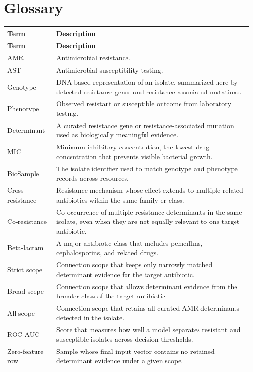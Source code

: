 \chapter*{Glossary}
{}

\begingroup
\small
\renewcommand{\arraystretch}{1.02}
\setlength{\LTpre}{0pt}
\setlength{\LTpost}{0pt}
\begin{longtable}{|p{}|p{}|}
\hline
\textbf{Term} & \textbf{Description} \\ \hline
\endfirsthead
\hline
\textbf{Term} & \textbf{Description} \\ \hline
\endhead
AMR & Antimicrobial resistance. \\ \hline
AST & Antimicrobial susceptibility testing. \\ \hline
Genotype & DNA-based representation of an isolate, summarized here by detected resistance genes and resistance-associated mutations. \\ \hline
Phenotype & Observed resistant or susceptible outcome from laboratory testing. \\ \hline
Determinant & A curated resistance gene or resistance-associated mutation used as biologically meaningful evidence. \\ \hline
MIC & Minimum inhibitory concentration, the lowest drug concentration that prevents visible bacterial growth. \\ \hline
BioSample & The isolate identifier used to match genotype and phenotype records across resources. \\ \hline
Cross-resistance & Resistance mechanism whose effect extends to multiple related antibiotics within the same family or class. \\ \hline
Co-resistance & Co-occurrence of multiple resistance determinants in the same isolate, even when they are not equally relevant to one target antibiotic. \\ \hline
Beta-lactam & A major antibiotic class that includes penicillins, cephalosporins, and related drugs. \\ \hline
Strict scope & Connection scope that keeps only narrowly matched determinant evidence for the target antibiotic. \\ \hline
Broad scope & Connection scope that allows determinant evidence from the broader class of the target antibiotic. \\ \hline
All scope & Connection scope that retains all curated AMR determinants detected in the isolate. \\ \hline
ROC-AUC & Score that measures how well a model separates resistant and susceptible isolates across decision thresholds. \\ \hline
Zero-feature row & Sample whose final input vector contains no retained determinant evidence under a given scope. \\ \hline
\end{longtable}
\endgroup
